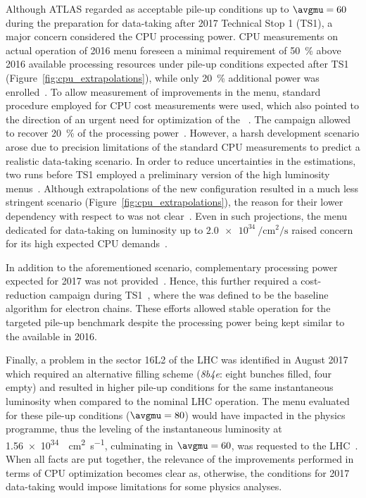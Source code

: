 Although ATLAS regarded as acceptable pile-up conditions up to $\avgmu=60$
during the preparation for data-taking after 2017 Technical Stop 1 (TS1), a
major concern considered the CPU processing power. CPU measurements on actual
operation of 2016 menu foreseen a minimal requirement of \SI{50}{\%} above 2016
available processing resources under pile-up conditions expected after TS1
(Figure~\ref{fig:cpu_extrapolations}), while only \SI{20}{\%} additional power
was enrolled~\cite{Shaw2017}. To allow measurement of improvements in the menu,
standard procedure employed for CPU cost measurements were used, which also
pointed to the direction of an urgent need for optimization of the
\hlt~\cite{Martin2017a,Shaw2017,Martin2017b}.  The campaign allowed to recover
\SI{20}{\%} of the processing power~\cite{Shaw2017}. However, a harsh
development scenario arose due to precision limitations of the standard CPU
measurements to predict a realistic data-taking scenario. In order to reduce
uncertainties in the estimations, two runs before TS1 employed a preliminary
version of the high luminosity menus~\cite{Stelzer2017}. Although extrapolations
of the new configuration resulted in a much less stringent scenario
(Figure~\ref{fig:cpu_extrapolations}), the reason for their lower dependency
with respect to \avgmu was not clear~\cite{ATR-16463}. Even in such projections,
the menu dedicated for data-taking on luminosity up to
$\SI{2.0e34}{\per\square\cm\per\second}$ raised concern for its high expected
CPU demands~\cite{ATR-16463}.

In addition to the aforementioned scenario, complementary processing power
expected for 2017 was not provided~\cite{Love2017}. Hence, this further required
a cost-reduction campaign during TS1~\cite{Leonidopoulos2017}, where the \rnn
was defined to be the baseline algorithm for electron chains. These efforts
allowed stable operation for the targeted pile-up benchmark despite the
processing power being kept similar to the available in 2016.

Finally, a problem in the sector 16L2 of the LHC was identified in August 2017
which required an alternative filling scheme (\emph{8b4e}: eight bunches filled,
four empty) and resulted in higher pile-up conditions for the same instantaneous
luminosity when compared to the nominal LHC operation. The menu evaluated for
these pile-up conditions ($\avgmu=80$) would have impacted in the physics
programme, thus the leveling of the instantaneous luminosity at
\SI{1.56e34}{\per\square\cm\per\second}, culminating in $\avgmu=60$, was
requested to the LHC~\cite{ATL-DAQ-PUB-2018-002}. When all facts are put
together, the relevance of the improvements performed in terms of CPU
optimization becomes clear as, otherwise, the conditions for 2017 data-taking
would impose limitations for some physics analyses.


